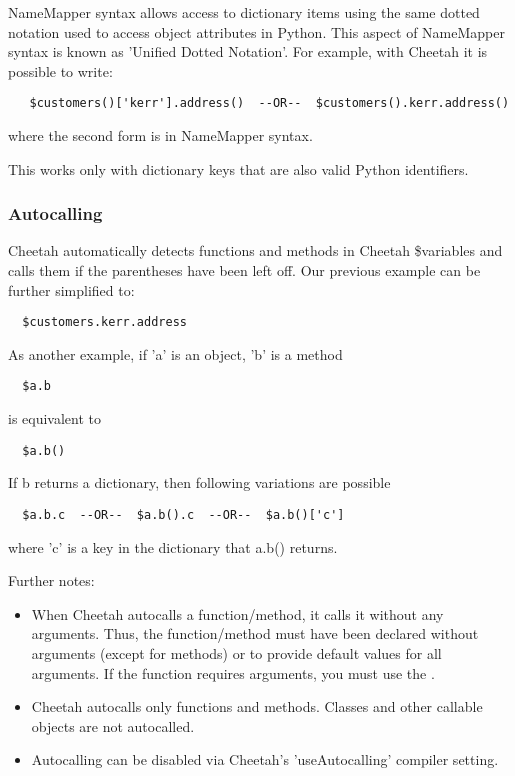 NameMapper syntax allows access to dictionary items using the same dotted
notation used to access object attributes in Python.  This aspect of NameMapper
syntax is known as 'Unified Dotted Notation'.
For example, with Cheetah it is possible to write:
\begin{verbatim}
   $customers()['kerr'].address()  --OR--  $customers().kerr.address()
\end{verbatim}
where the second form is in NameMapper syntax.

This works only with dictionary keys that are also valid Python identifiers.

\subsubsection{Autocalling}
\label{language.namemapper.autocalling}

Cheetah automatically detects functions and methods in Cheetah \$variables and
calls them if the parentheses have been left off.  Our previous example can be
further simplified to:
\begin{verbatim}
  $customers.kerr.address
\end{verbatim}

As another example, if 'a' is an object, 'b' is a method
\begin{verbatim}
  $a.b
\end{verbatim}

is equivalent to

\begin{verbatim}
  $a.b()
\end{verbatim}

If b returns a dictionary, then following variations are possible
\begin{verbatim}
  $a.b.c  --OR--  $a.b().c  --OR--  $a.b()['c']
\end{verbatim}
where 'c' is a key in the dictionary that a.b() returns.

Further notes:
\begin{itemize}
\item When Cheetah autocalls a function/method, it calls it without any
arguments.  Thus, the function/method must have been declared without arguments
(except  for methods) or to provide default values for all arguments.
If the function requires arguments, you must use the \code{()}.

\item Cheetah autocalls only functions and methods.  Classes and other callable
objects are not autocalled.  

\item Autocalling can be disabled via Cheetah's 'useAutocalling' compiler
setting.
\end{itemize}

